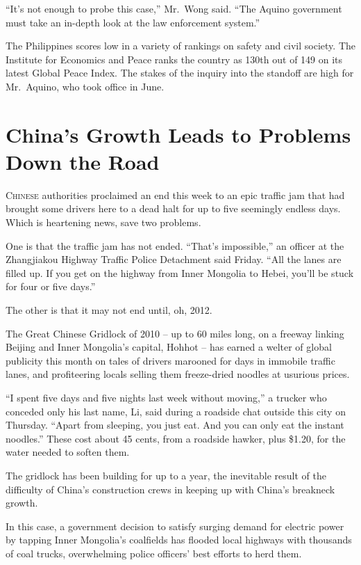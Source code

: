 ﻿\documentclass[12pt]{article}
\begin{document}
``It's not enough to probe this case,'' Mr.~Wong said. ``The Aquino government must take an in-depth
look at the law enforcement system.''

The Philippines scores low in a variety of rankings on safety and civil society. The Institute for
Economics and Peace ranks the country as 130th out of 149 on its latest Global Peace Index. The
stakes of the inquiry into the standoff are high for Mr.~Aquino, who took office in June.

\pagebreak
\section{China's Growth Leads to Problems Down the Road}

\lettrine{C}{hinese} authorities proclaimed an end this week to an epic
traffic jam that had brought some drivers here to a dead halt for up to five seemingly endless days.
Which is heartening news, save two problems.

One is that the traffic jam has not ended. ``That's impossible,'' an officer at the Zhangjiakou
Highway Traffic Police Detachment said Friday. ``All the lanes are filled up. If you get on the
highway from Inner Mongolia to Hebei, you'll be stuck for four or five days.''

The other is that it may not end until, oh, 2012.

The Great Chinese Gridlock of 2010 -- up to 60 miles long, on a freeway linking Beijing and Inner
Mongolia's capital, Hohhot -- has earned a welter of global publicity this month on tales of drivers
marooned for days in immobile traffic lanes, and profiteering locals selling them freeze-dried
noodles at usurious prices.

``I spent five days and five nights last week without moving,'' a trucker who conceded only his last
name, Li, said during a roadside chat outside this city on Thursday. ``Apart from sleeping, you just
eat. And you can only eat the instant noodles.'' These cost about 45 cents, from a roadside hawker,
plus \$1.20, for the water needed to soften them.

The gridlock has been building for up to a year, the inevitable result of the difficulty of China's
construction crews in keeping up with China's breakneck growth.

In this case, a government decision to satisfy surging demand for electric power by tapping Inner
Mongolia's coalfields has flooded local highways with thousands of coal trucks, overwhelming police
officers' best efforts to herd them.
\end{document}
